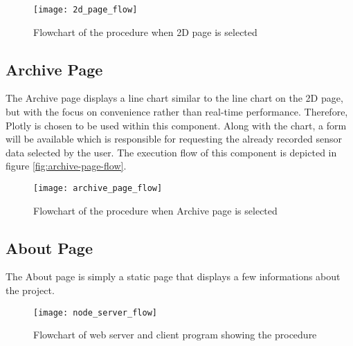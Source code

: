 \begin{figure}[H]
    \centering
    \texttt{[image: 2d\_page\_flow]}
    \caption{Flowchart of the procedure when 2D page is selected}
    \label{fig:2d-page-flow}
\end{figure}

\subsection{Archive Page}
The Archive page displays a line chart similar to the line chart on the 2D page, but with the focus on convenience rather than real-time performance. Therefore, Plotly is chosen to be used within this component. Along with the chart, a form will be available which is responsible for requesting the already recorded sensor data selected by the user. The execution flow of this component is depicted in figure \vref{fig:archive-page-flow}.

\begin{figure}[h]
    \centering
    \texttt{[image: archive\_page\_flow]}
    \caption{Flowchart of the procedure when Archive page is selected}
    \label{fig:archive-page-flow}
\end{figure}

\subsection{About Page}
The About page is simply a static page that displays a few informations about the project.

\begin{figure}[h]
    \centering
    \texttt{[image: node\_server\_flow]}
    \caption{Flowchart of web server and client program showing the procedure}
    \label{fig:webserver-program-flow}
\end{figure}
